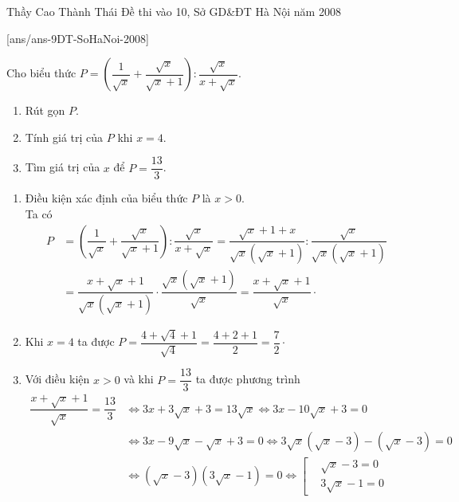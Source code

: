 \begin{name}
{Thầy  Cao Thành Thái}
{Đề thi vào 10, Sở GD\&ĐT Hà Nội năm 2008}
\end{name}
\setcounter{ex}{0}
[ans/ans-9DT-SoHaNoi-2008]


\begin{ex}%
 Cho biểu thức  $P=\left( \dfrac{1}{\sqrt{x}}+\dfrac{\sqrt{x}}{\sqrt{x}+1} \right):\dfrac{\sqrt{x}}{x+\sqrt{x}}$.
 \begin{enumerate}
  \item Rút gọn $P$.
  \item Tính giá trị của $P$ khi $x= 4$.
  \item Tìm giá trị của $x$ để $P = \dfrac{13}{3}$.
 \end{enumerate}
 \loigiai
  {
  \begin{enumerate}
   \item Điều kiện xác định của biểu thức $P$ là $x > 0$.\\
   Ta có
   \allowdisplaybreaks
   \begin{align*}
    P & =\left( \dfrac{1}{\sqrt{x}}+\dfrac{\sqrt{x}}{\sqrt{x}+1} \right):\dfrac{\sqrt{x}}{x+\sqrt{x}} = \dfrac{\sqrt{x} + 1 + x}{\sqrt{x} \left( \sqrt{x} + 1 \right)} : \dfrac{\sqrt{x}}{\sqrt{x} \left( \sqrt{x} + 1 \right)}\\
      & = \dfrac{x + \sqrt{x} + 1}{\sqrt{x} \left( \sqrt{x} + 1 \right)} \cdot \dfrac{\sqrt{x} \left( \sqrt{x} + 1 \right)}{\sqrt{x}} = \dfrac{x + \sqrt{x} + 1}{\sqrt{x}} \cdot
   \end{align*}
   \item Khi $x = 4$ ta được $P = \dfrac{4 + \sqrt{4} + 1}{\sqrt{4}} = \dfrac{4 + 2 + 1}{2} = \dfrac{7}{2} \cdot$
   \item Với điều kiện $x > 0$ và khi $P = \dfrac{13}{3}$ ta được phương trình
   \allowdisplaybreaks
   \begin{align*}
    \dfrac{x + \sqrt{x} + 1}{\sqrt{x}} = \dfrac{13}{3} & \Leftrightarrow 3x + 3\sqrt{x} + 3 = 13\sqrt{x}
     \Leftrightarrow 3x - 10\sqrt{x} + 3 = 0 \\
    & \Leftrightarrow 3x - 9\sqrt{x} - \sqrt{x} + 3 = 0 
     \Leftrightarrow 3\sqrt{x} \left( \sqrt{x} - 3 \right) - \left( \sqrt{x} - 3 \right) = 0 \\
    & \Leftrightarrow \left( \sqrt{x} - 3 \right)\left(3\sqrt{x} - 1 \right) = 0 
     \Leftrightarrow \left[\begin{aligned} & \sqrt{x} - 3 = 0 \\& 3\sqrt{x} - 1 = 0 \end{aligned}\right. \\

\end{align*}
\end{enumerate}}
\end{ex}
